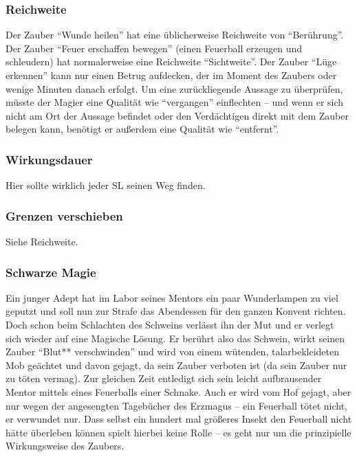 \subsubsection{Reichweite}

Der Zauber "`Wunde heilen"' hat eine üblicherweise Reichweite von "`Berührung"'.
Der Zauber "`Feuer erschaffen bewegen"' (einen Feuerball erzeugen und schleudern) hat normalerweise eine Reichweite "`Sichtweite"'.
Der Zauber "`Lüge erkennen"' kann nur einen Betrug aufdecken, der im Moment des Zaubers oder wenige Minuten danach erfolgt. Um eine zurückliegende Aussage zu überprüfen, müsste der Magier eine Qualität wie "`vergangen"' einflechten -- und wenn er sich nicht am Ort der Aussage befindet oder den  Verdächtigen direkt mit dem Zauber belegen kann, benötigt er außerdem eine Qualität wie "`entfernt"'.

\subsubsection{Wirkungsdauer}

Hier sollte wirklich jeder SL seinen Weg finden.

\subsubsection{Grenzen verschieben}
Siehe Reichweite.

\subsubsection{Schwarze Magie}

Ein junger Adept hat im Labor seines Mentors ein paar Wunderlampen zu viel geputzt und soll nun zur Strafe das Abendessen für den ganzen Konvent richten. Doch schon beim Schlachten des Schweins verlässt ihn der Mut und er verlegt sich wieder auf eine Magische Lösung. Er berührt also das Schwein, wirkt seinen Zauber "`Blut** verschwinden"' und wird von einem wütenden, talarbekleideten Mob geächtet und davon gejagt, da sein Zauber verboten ist (da sein Zauber nur zu töten vermag). Zur gleichen Zeit entledigt sich sein leicht aufbrausender Mentor mittels eines Feuerballs einer Schnake. Auch er wird vom Hof gejagt, aber nur wegen der angesengten Tagebücher des Erzmagus -- ein Feuerball tötet nicht, er verwundet nur. Dass selbst ein hundert mal größeres Insekt den Feuerball nicht hätte überleben können spielt hierbei keine Rolle -- es geht nur um die prinzipielle Wirkungsweise des Zaubers.


